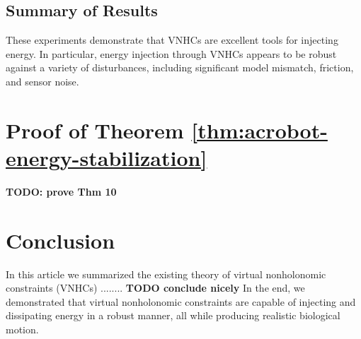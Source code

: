 \documentclass[journal,twoside,web]{ieeecolor}
\begin{document}
\subsection{Summary of Results} 
These experiments demonstrate that VNHCs are excellent tools for injecting
energy.
In particular, energy injection through VNHCs appears to be robust against a
variety of disturbances, including significant model mismatch, friction, and
sensor noise.

\section{Proof of Theorem \ref{thm:acrobot-energy-stabilization}}\label{sec:proof}
\textbf{TODO: prove Thm 10}

\section{Conclusion}\label{sec:conclusion}
In this article we summarized the existing theory of virtual nonholonomic
constraints (VNHCs) ........
\textbf{TODO conclude nicely}
In the end, we demonstrated that virtual nonholonomic constraints are capable of
injecting and dissipating energy in a robust manner, all while producing
realistic biological motion.




\end{document}
